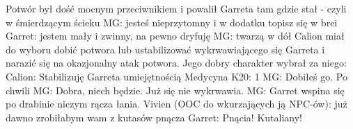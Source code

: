 \documentclass[10pt,twoside,twocolumn]{book}
\begin{document}
%       
Potwór był dość mocnym przeciwnikiem i powalił Garreta tam gdzie stał - czyli w śmierdzącym ścieku
MG: jesteś nieprzytomny i w dodatku topisz się w brei
Garret: jestem mały i zwinny, na pewno dryfuję
MG: twarzą w dół
%    
%       
Calion miał do wyboru dobić potwora lub ustabilizować wykrwawiającego się Garreta i narazić się na okazjonalny atak potwora. Jego dobry charakter wybrał za niego:
Calion: Stabilizuję Garreta umiejętnością
Medycyna K20: 1
MG: Dobiłeś go.
Po chwili
MG: Dobra, niech będzie. Już się nie wykrwawia.
%    
%       
MG: Garret wspina się po drabinie niczym rącza łania.
%    
%       
Vivien (OOC do wkurzających ją NPC-ów): już dawno zrobiłabym wam z kutasów pnącza
Garret: Pnącia! Kutaliany!
%    
\end{document}

